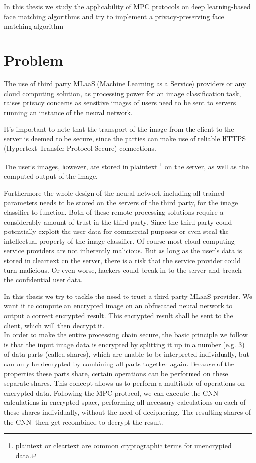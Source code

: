 In this thesis we study the applicability of MPC protocols on deep learning-based face matching algorithms and try to implement a privacy-preserving face matching algorithm.

\section{Problem}
The use of third party MLaaS (Machine Learning as a Service) providers or any cloud computing solution, as processing power for an image classification task, raises privacy concerns as sensitive images of users need to be sent to servers running an instance of the neural network.

It's important to note that the transport of the image from the client to the server is deemed to be secure, since the parties can make use of reliable HTTPS (Hypertext Transfer Protocol Secure) connections.

The user's images, however, are stored in plaintext \footnote{plaintext or cleartext are common cryptographic terms for unencrypted data.} on the server, as well as the computed output of the image.

Furthermore the whole design of the neural network including all trained parameters needs to be stored on the servers of the third party, for the image classifier to function. Both of these remote processing solutions require a considerably amount of trust in the third party. Since the third party could potentially exploit the user data for commercial purposes or even steal the intellectual property of the image classifier. Of course most cloud computing service providers are not inherently malicious. But as long as the user's data is stored in cleartext on the server, there is a risk that the service provider could turn malicious. Or even worse, hackers could break in to the server and breach the confidential user data.

In this thesis we try to tackle the need to trust a third party MLaaS provider. We want it to compute an encrypted image on an obfuscated neural network to output a correct encrypted result. This encrypted result shall be sent to the client, which will then decrypt it.\\

In order to make the entire processing chain secure, the basic principle we follow is that the input image data is encrypted by splitting it up in a number (e.g. 3) of data parts (called shares), which are unable to be interpreted individually, but can only be decrypted by combining all parts together again. Because of the properties these parts share, certain operations can be performed on these separate shares. This concept allows us to perform a multitude of operations on encrypted data. Following the MPC protocol, we can execute the CNN calculations in encrypted space, performing all necessary calculations on each of these shares individually, without the need of deciphering. The resulting shares of the CNN, then get recombined to decrypt the result.


